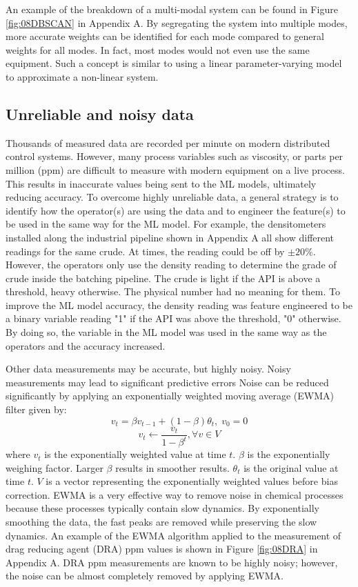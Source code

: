 An example of the breakdown of a multi-modal system can be found in Figure \ref{fig:08DBSCAN} in Appendix A.  By segregating the system into multiple modes, more accurate weights can be identified for each mode compared to general weights for all modes.  In fact, most modes would not even use the same equipment.  Such a concept is similar to using a linear parameter-varying model to approximate a non-linear system.  

\subsection{Unreliable and noisy data}
Thousands of measured data are recorded per minute on modern distributed control systems. However, many process variables such as viscosity, or parts per million (ppm) are difficult to measure with modern equipment on a live process. This results in inaccurate values being sent to the ML models, ultimately reducing accuracy.  To overcome highly unreliable data, a general strategy is to identify how the operator(s) are using the data and to engineer the feature(s) to be used in the same way for the ML model.  For example, the densitometers installed along the industrial pipeline shown in Appendix A all show different readings for the same crude. At times, the reading could be off by $\pm 20\%$. However, the operators only use the density reading to determine the grade of crude inside the batching pipeline. The crude is light if the API is above a threshold, heavy otherwise.  The physical number had no meaning for them.  To improve the ML model accuracy, the density reading was feature engineered to be a binary variable reading "1" if the API was above the threshold, "0" otherwise.  By doing so, the variable in the ML model was used in the same way as the operators and the accuracy increased.

Other data measurements may be accurate, but highly noisy. Noisy measurements may lead to significant predictive errors 
Noise can be reduced significantly by applying an exponentially weighted moving average (EWMA) filter given by:
\begin{equation}
    v_t = \beta v_{t - 1} + (1 - \beta) \theta_t, \; v_0 = 0
    \label{eq:08EWMA}
\end{equation}
\begin{equation}
    v_t \leftarrow \frac{v_t}{1 - \beta^t}, \forall v \in V
    \label{eq:08Bias_Correction}
\end{equation}
where $v_{t}$ is the exponentially weighted value at time $t$.  $\beta$ is the exponentially weighing factor.  Larger $\beta$ results in smoother results.  $\theta_t$ is the original value at time $t$. $V$ is a vector representing the exponentially weighted values before bias correction. EWMA is a very effective way to remove noise in chemical processes because these processes typically contain slow dynamics. By exponentially smoothing the data, the fast peaks are removed while preserving the slow dynamics. An example of the EWMA algorithm applied to the measurement of drag reducing agent (DRA) ppm values is shown in Figure \ref{fig:08DRA} in Appendix A.  DRA ppm measurements are known to be highly noisy; however, the noise can be almost completely removed by applying EWMA.

